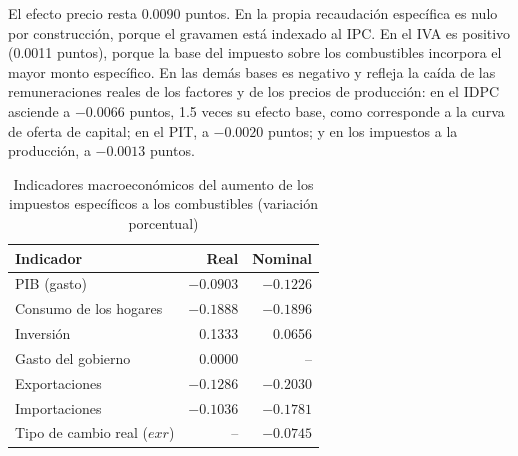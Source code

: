 \documentclass[11pt]{article}
\begin{document}
El efecto precio resta 0.0090 puntos. En la propia recaudación específica es nulo por construcción, porque el gravamen está indexado al IPC. En el IVA es positivo (0.0011 puntos), porque la base del impuesto sobre los combustibles incorpora el mayor monto específico. En las demás bases es negativo y refleja la caída de las remuneraciones reales de los factores y de los precios de producción: en el IDPC asciende a $-0.0066$ puntos, 1.5 veces su efecto base, como corresponde a la curva de oferta de capital; en el PIT, a $-0.0020$ puntos; y en los impuestos a la producción, a $-0.0013$ puntos.

\begin{table}[H]
\centering
\caption{Indicadores macroeconómicos del aumento de los impuestos específicos a los combustibles (variación porcentual)}
\begin{tabular}{|l|r|r|}
  \hline
  Indicador & Real & Nominal \\
  \hline
  PIB (gasto) & $-0.0903$ & $-0.1226$ \\
  \hline
  Consumo de los hogares & $-0.1888$ & $-0.1896$ \\
  \hline
  Inversión & 0.1333 & 0.0656 \\
  \hline
  Gasto del gobierno & 0.0000 & -- \\
  \hline
  Exportaciones & $-0.1286$ & $-0.2030$ \\
  \hline
  Importaciones & $-0.1036$ & $-0.1781$ \\
  \hline
  Tipo de cambio real ($exr$) & -- & $-0.0745$ \\
  \hline
\end{tabular}
\end{table}
\end{document}
